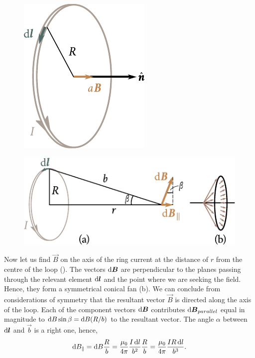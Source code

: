 \begin{figure}[t]
	\begin{minipage}[t]{0.35\linewidth}
		\begin{center}
			\includegraphics[scale=0.98]{figures/ch_06/fig_6_18.pdf}
			\caption[]{}
			\label{fig:6_18}
		\end{center}
	\end{minipage}
	\hfill{ }%
	\begin{minipage}[t]{0.61\linewidth}
		\begin{center}
			\includegraphics[scale=0.98]{figures/ch_06/fig_6_19.pdf}
			\caption[]{}
			\label{fig:6_19}
		\end{center}
	\end{minipage}
\vspace{-0.4cm}
\end{figure}

Now let us find $\vec{B}$ on the axis of the ring current at the distance of $r$ from the centre of the loop (). The vectors $\mathrm{d}\boldsymbol{B}$ are perpendicular to the planes passing through the relevant element $\mathrm{d}\boldsymbol{l}$ and the point where we are seeking the field. Hence, they form a symmetrical conical fan (b). We can conclude from considerations of symmetry that the resultant vector $\vec{B}$ is directed along the axis of the loop.
Each of the component vectors $\mathrm{d}\boldsymbol{B}$ contributes $\mathrm{d}\boldsymbol{B}_{parallel}$ equal in magnitude to $\mathrm{d} B\sin\beta=\mathrm{d} B(R/b)$ to the resultant vector. The angle $\alpha$ between $\mathrm{d}\boldsymbol{l}$ and $\vec{b}$ is a right one, hence,
\begin{equation*}
    \mathrm{d} B_{\parallel} = \mathrm{d} B \frac{R}{b} = \frac{\mu_0}{4\pi} \frac{I\, \mathrm{d} l}{b^2} \frac{R}{b} = \frac{\mu_0}{4\pi} \frac{I R\, \mathrm{d} l}{b^3}.
\end{equation*}

